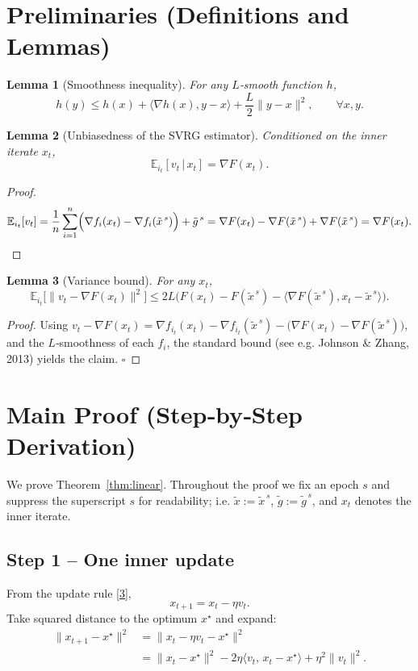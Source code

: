 \documentclass[11pt]{article}
\newtheorem{lemma}{Lemma}
\newcommand{\E}{\mathbb{E}}
\begin{document}
\section*{Preliminaries (Definitions and Lemmas)}
\begin{lemma}[Smoothness inequality]\label{lem:smooth}
For any $L$‑smooth function $h$,
\[
h(y)\le h(x)+\langle\nabla h(x),y-x\rangle+\frac{L}{2}\|y-x\|^{2},
\qquad\forall x,y.
\]
\end{lemma}
\begin{lemma}[Unbiasedness of the SVRG estimator]\label{lem:unbiased}
Conditioned on the inner iterate $x_t$,
\[
\E_{i_t}[v_t\,|\,x_t]=\nabla F(x_t).
\]
\end{lemma}
\begin{proof}
\[
\E_{i_t}[v_t]=\frac1n\sum_{i=1}^{n}
\Bigl(\nabla f_i(x_t)-\nabla f_i(\tilde{x}^{\,s})\Bigr)+\tilde{g}^{\,s}
=\nabla F(x_t)-\nabla F(\tilde{x}^{\,s})+\nabla F(\tilde{x}^{\,s})
=\nabla F(x_t).
\]
\end{proof}
\begin{lemma}[Variance bound]\label{lem:var}
For any $x_t$,
\[
\E_{i_t}\!\bigl[\|v_t-\nabla F(x_t)\|^{2}\bigr]
\le 2L\bigl(F(x_t)-F(\tilde{x}^{\,s})- \langle\nabla F(\tilde{x}^{\,s}),x_t-\tilde{x}^{\,s}\rangle\bigr).
\]
\end{lemma}
\begin{proof}
Using $v_t-\nabla F(x_t)=\nabla f_{i_t}(x_t)-\nabla f_{i_t}(\tilde{x}^{\,s})-\bigl(\nabla F(x_t)-\nabla F(\tilde{x}^{\,s})\bigr)$,
and the $L$‑smoothness of each $f_i$, the standard bound (see e.g. Johnson \& Zhang, 2013) yields the claim. \hfill $\square$
\end{proof}

\section*{Main Proof (Step‑by‑Step Derivation)}
We prove Theorem~\ref{thm:linear}.  Throughout the proof we fix an epoch $s$ and suppress the superscript $s$ for readability; i.e. $\tilde{x}:=\tilde{x}^{\,s}$, $\tilde{g}:=\tilde{g}^{\,s}$, and $x_t$ denotes the inner iterate.

\subsection*{Step 1 – One inner update}
From the update rule \eqref{3},
\[
x_{t+1}=x_t-\eta v_t.
\]
Take squared distance to the optimum $x^\star$ and expand:
\[
\begin{aligned}
\|x_{t+1}-x^\star\|^{2}
&=\|x_t-\eta v_t-x^\star\|^{2}\\
&=\|x_t-x^\star\|^{2}
-2\eta\langle v_t,\,x_t-x^\star\rangle
+\eta^{2}\|v_t\|^{2}. \tag{6}
\end{aligned}
\]
\end{document}
